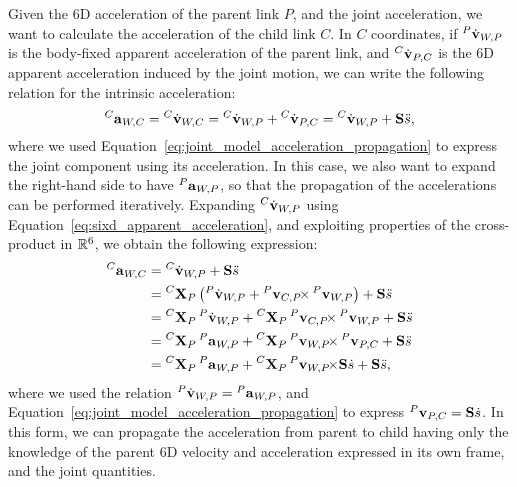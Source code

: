 \begin{definition*}
\label{definition:propagation_accelerations}
%
Given the 6D acceleration of the parent link $P$, and the joint acceleration, we want to calculate the acceleration of the child link $C$.
In $C$ coordinates, if $\velsixd[P]_{W,P}$ is the body-fixed apparent acceleration of the parent link, and $\velsixd[C]_{P,C}$ is the 6D apparent acceleration induced by the joint motion, we can write the following relation for the intrinsic acceleration:
%
\begin{equation*}
    \accsix[C]_{W,C} = \velsixd[C]_{W,C}
    = \velsixd[C]_{W,P} + \velsixd[C]_{P,C} = \velsixd[C]_{W,P} + \subspace \ddot{\shape}
    ,
\end{equation*}
%
where we used Equation~\eqref{eq:joint_model_acceleration_propagation} to express the joint component using its acceleration.
In this case, we also want to expand the right-hand side to have $\accsix[P]_{W,P}$, so that the propagation of the accelerations can be performed iteratively.
Expanding $\velsixd[C]_{W,P}$ using Equation~\eqref{eq:sixd_apparent_acceleration}, and exploiting properties of the cross-product in $\realn^6$, we obtain the following expression:
%
\begin{align*}
    \accsix[C]_{W,C}
    &= \velsixd[C]_{W,P} + \subspace \ddot{\shape} \\
    &= \transvel[C]_P \left( \velsixd[P]_{W,P} + \crossvelsix[{\velsix[P]_{C,P}}] \velsix[P]_{W,P} \right) + \subspace \ddot{\shape} \\
    &= \transvel[C]_P \velsixd[P]_{W,P} + \transvel[C]_P \crossvelsix[{\velsix[P]_{C,P}}] \velsix[P]_{W,P} + \subspace \ddot{\shape} \\
    &= \transvel[C]_P \accsix[P]_{W,P} + \transvel[C]_P \crossvelsix[{\velsix[P]_{W,P}}] \velsix[P]_{P,C} + \subspace \ddot{\shape} \\
    &= \transvel[C]_P \accsix[P]_{W,P} + \transvel[C]_P \crossvelsix[{\velsix[P]_{W,P}}] \subspace \dot{s} + \subspace \ddot{\shape}
    ,
\end{align*}
%
where we used the relation $\velsixd[P]_{W,P} = \accsix[P]_{W,P}$, and Equation~\eqref{eq:joint_model_acceleration_propagation} to express $\velsix[P]_{P,C} = \subspace \dot{\shape}$.
In this form, we can propagate the acceleration from parent to child having only the knowledge of the parent 6D velocity and acceleration expressed in its own frame, and the joint quantities.
%
\end{definition*}

